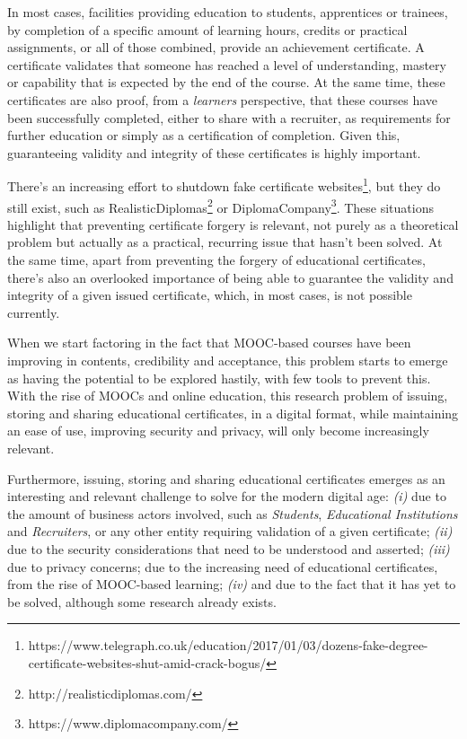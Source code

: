 In most cases, facilities providing education to students, apprentices or trainees, by completion of a specific amount of learning hours, credits or practical assignments, or all of those combined, provide an achievement certificate. A certificate validates that someone has reached a level of understanding, mastery or capability that is expected by the end of the course. At the same time, these certificates are also proof, from a \textit{learners} perspective, that these courses have been successfully completed, either to share with a recruiter, as requirements for further education or simply as a certification of completion. Given this, guaranteeing validity and integrity of these certificates is highly important.
  
There's an increasing effort to shutdown fake certificate websites\footnote{https://www.telegraph.co.uk/education/2017/01/03/dozens-fake-degree-certificate-websites-shut-amid-crack-bogus/}, but they do still exist, such as RealisticDiplomas\footnote{http://realisticdiplomas.com/} or DiplomaCompany\footnote{https://www.diplomacompany.com/}. These situations highlight that preventing certificate forgery is relevant, not purely as a theoretical problem but actually as a practical, recurring issue that hasn't been solved. At the same time, apart from preventing the forgery of educational certificates, there's also an overlooked importance of being able to guarantee the validity and integrity of a given issued certificate, which, in most cases, is not possible currently.

When we start factoring in the fact that MOOC-based courses have been improving in contents, credibility and acceptance, this problem starts to emerge as having the potential to be explored hastily, with few tools to prevent this. With the rise of MOOCs and online education, this research problem of issuing, storing and sharing educational certificates, in a digital format, while maintaining an ease of use, improving security and privacy, will only become increasingly relevant. 

Furthermore, issuing, storing and sharing educational certificates emerges as an interesting and relevant challenge to solve for the modern digital age: \emph{(i)} due to the amount of business actors involved, such as \textit{Students}, \textit{Educational Institutions} and \textit{Recruiters}, or any other entity requiring validation of a given certificate; \emph{(ii)} due to the security considerations that need to be understood and asserted; \emph{(iii)} due to privacy concerns; due to the increasing need of educational certificates, from the rise of MOOC-based learning; \emph{(iv)} and due to the fact that it has yet to be solved, although some research already exists.

